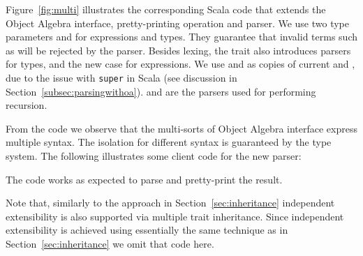Figure~\ref{fig:multi} illustrates the corresponding Scala code 
that extends the Object Algebra interface, pretty-printing operation and parser. We use two type parameters  and  for expressions and types. They guarantee that invalid terms such as  will be rejected by the parser.
Besides lexing, the trait  also introduces parsers for types, and the new case for expressions. 
We use  and  as copies of current  and , due to the issue 
with \lstinline{super} in Scala (see discussion in Section~\ref{subsec:parsingwithoa}).  and  are the parsers used for performing recursion.

From the code we observe that the multi-sorts of Object Algebra interface
express multiple syntax. The isolation for different syntax
is guaranteed by the type system. The following illustrates some client code
for the new parser:

The code works as expected to parse and pretty-print the result.

Note that, similarly to the approach in Section~\ref{sec:inheritance} independent extensibility is also supported via multiple trait inheritance. 
Since independent extensibility is achieved using essentially the same technique as in Section~\ref{sec:inheritance} we omit that code here. 